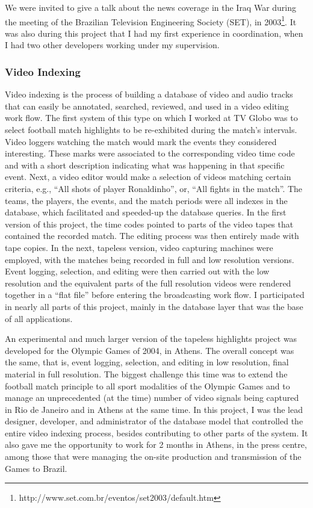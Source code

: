 \documentclass[a4paper]{article}
\begin{document}
We were invited to give a talk about the news coverage in the Iraq War during the meeting of the Brazilian Television Engineering Society (SET), in 2003\footnote{http://www.set.com.br/eventos/set2003/default.htm}. It was also during this project that I had my first experience in coordination, when I had two other developers working under my supervision.

\subsubsection{Video Indexing}

Video indexing is the process of building a database of video and audio tracks that can easily be annotated, searched, reviewed, and used in a video editing work flow. The first system of this type on which I worked at TV Globo was to select football match highlights to be re-exhibited during the match's intervals. Video loggers watching the match would mark the events they considered interesting. These marks were associated to the corresponding video time code and with a short description indicating what was happening in that specific event. Next, a video editor would make a selection of videos matching certain criteria, e.g., ``All shots of player Ronaldinho'', or, ``All fights in the match''. The teams, the players, the events, and the match periods were all indexes in the database, which facilitated and speeded-up the database queries. In the first version of this project, the time codes pointed to parts of the video tapes that contained the recorded match. The editing process was then entirely made with tape copies. In the next, tapeless version, video capturing machines were employed, with the matches being recorded in full and low resolution versions. Event logging, selection, and editing were then carried out with the low resolution and the equivalent parts of the full resolution videos were rendered together in a ``flat file'' before entering the broadcasting work flow. I participated in nearly all parts of this project, mainly in the database layer that was the base of all applications. 

An experimental and much larger version of the tapeless highlights project was developed for the Olympic Games of 2004, in Athens. The overall concept was the same, that is, event logging, selection, and editing in low resolution, final material in full resolution. The biggest challenge this time was to extend the football match principle to all sport modalities of the Olympic Games and to manage an unprecedented (at the time) number of video signals being captured in Rio de Janeiro and in Athens at the same time. In this project, I was the lead designer, developer, and administrator of the database model that controlled the entire video indexing process, besides contributing to other parts of the system. It also gave me the opportunity to work for 2 months in Athens, in the press centre, among those that were managing the on-site production and transmission of the Games to Brazil.
\end{document}
